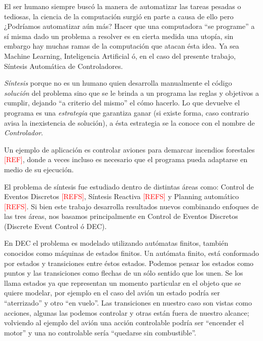 
El ser humano siempre buscó la manera de automatizar las tareas pesadas o tediosas, la ciencia de la computación surgió en parte a causa de ello pero ¿Podríamos automatizar aún más? 
Hacer que una computadora ``se programe'' a sí misma dado un problema a resolver es en cierta medida una utopía, sin embargo hay muchas ramas de la computación que atacan ésta idea. Ya sea Machine Learning, Inteligencia Artificial ó, en el caso del presente trabajo, Síntesis Automática de Controladores.

\textit{Síntesis} porque no es un humano quien desarrolla manualmente el código \textit{solución} del problema sino que se le brinda a un programa las reglas y objetivos a cumplir, dejando ``a criterio del mismo'' el cómo hacerlo. Lo que devuelve el programa es una \textit{estrategia} que garantiza ganar (si existe forma, caso contrario avisa la inexistencia de solución), a ésta estrategia se la conoce con el nombre de \textit{Controlador}.

Un ejemplo de aplicación es controlar aviones para demarcar incendios forestales \textcolor{red}{[REF]}, donde a veces incluso es necesario que el programa pueda adaptarse en medio de su ejecución. %

El problema de síntesis fue estudiado dentro de distintas áreas como: Control de Eventos Discretos \textcolor{red}{[REFS]}, Síntesis Reactiva \textcolor{red}{[REFS]} y Planning automático \textcolor{red}{[REFS]}. %
Si bien este trabajo desarrolla resultados nuevos combinando enfoques de las tres áreas, nos basamos principalmente en Control de Eventos Discretos (Discrete Event Control ó DEC).

 En DEC el problema es modelado utilizando autómatas finitos, también conocidos como máquinas de estados finitos. 
Un autómata finito, está conformado por estados y transiciones entre éstos estados. Podemos pensar los estados como puntos y las transiciones como flechas de un sólo sentido que los unen. Se los llama estados ya que representan un momento particular en el objeto que se quiere modelar, por ejemplo en el caso del avión un estado podría ser ``aterrizado'' y otro ``en vuelo''. Las transiciones en nuestro caso son vistas como acciones, algunas las podemos controlar y otras están fuera de nuestro alcance; volviendo al ejemplo del avión una acción controlable podría ser ``encender el motor'' y una no controlable sería ``quedarse sin combustible''.

